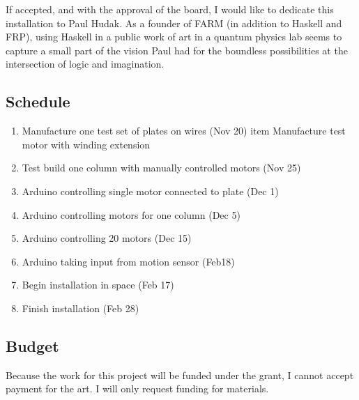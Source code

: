 If accepted, and with the approval of the board, I would like to dedicate this installation to Paul Hudak.
As a founder of FARM (in addition to Haskell and FRP), using Haskell in a public work of art in a quantum physics lab seems to capture a small part of the vision Paul had for the boundless possibilities at the intersection of logic and imagination.

\subsection{Schedule}

\begin{enumerate}
\item Manufacture one test set of plates on wires (Nov 20)
item Manufacture test motor with winding extension
\item Test build one column with manually controlled motors (Nov 25)
\item Arduino controlling single motor connected to plate (Dec 1)
\item Arduino controlling motors for one column (Dec 5)
\item Arduino controlling 20 motors (Dec 15)
\item Arduino taking input from motion sensor (Feb18)
\item Begin installation in space (Feb 17)
\item Finish installation (Feb 28)
\end{enumerate}

\subsection{Budget}

Because the work for this project will be funded under the grant, I cannot accept payment for the art.
I will only request funding for materials.


